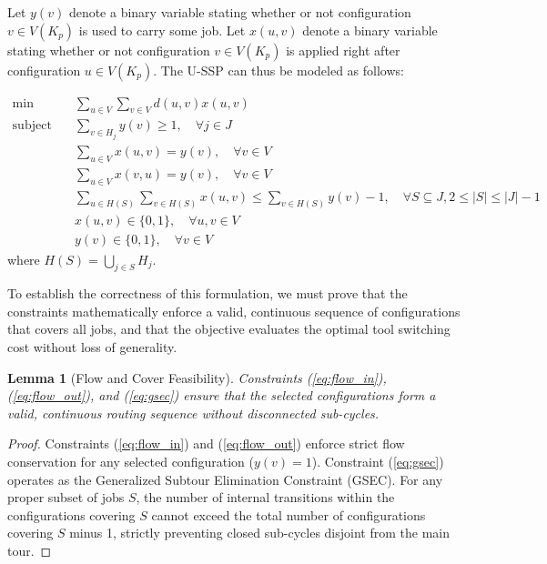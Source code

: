 \documentclass[12pt]{article}
\newtheorem{lemma}[theorem]{Lemma}
\begin{document}
	Let $y(v)$ denote a binary variable stating whether or not configuration $v \in V(K_p)$ is used to carry some job. Let $x(u, v)$ denote a binary variable stating whether or not configuration $v \in V(K_p)$ is applied right after configuration $u \in V(K_p)$. The U-SSP can thus be modeled as follows:
	
\begin{align}
	\min \quad & \sum_{u \in V} \sum_{v \in V} d(u, v) x(u, v) \label{eq:obj} \\
	\text{subject to} \quad & \sum_{v \in H_j} y(v) \ge 1, \quad \forall j \in J \label{eq:cover} \\
	& \sum_{u \in V} x(u, v) = y(v), \quad \forall v \in V \label{eq:flow_in} \\
	& \sum_{u \in V} x(v, u) = y(v), \quad \forall v \in V \label{eq:flow_out} \\
	& \sum_{u \in H(S)} \sum_{v \in H(S)} x(u, v) \le \sum_{v \in H(S)} y(v) - 1, \quad \forall S \subseteq J, 2 \le |S| \le |J| - 1 \label{eq:gsec} \\
	& x(u, v) \in \{0,1\}, \quad \forall u, v \in V \label{eq:domain_x} \\
	& y(v) \in \{0,1\}, \quad \forall v \in V \label{eq:domain_y}
\end{align}
where $H(S) = \bigcup_{j \in S} H_j$.

To establish the correctness of this formulation, we must prove that the constraints mathematically enforce a valid, continuous sequence of configurations that covers all jobs, and that the objective evaluates the optimal tool switching cost without loss of generality.

\begin{lemma}[Flow and Cover Feasibility]
	Constraints (\ref{eq:flow_in}), (\ref{eq:flow_out}), and (\ref{eq:gsec}) ensure that the selected configurations form a valid, continuous routing sequence without disconnected sub-cycles.
\end{lemma}
\begin{proof}
	Constraints (\ref{eq:flow_in}) and (\ref{eq:flow_out}) enforce strict flow conservation for any selected configuration ($y(v) = 1$). Constraint (\ref{eq:gsec}) operates as the Generalized Subtour Elimination Constraint (GSEC). For any proper subset of jobs $S$, the number of internal transitions within the configurations covering $S$ cannot exceed the total number of configurations covering $S$ minus 1, strictly preventing closed sub-cycles disjoint from the main tour.
\end{proof}
\end{document}
